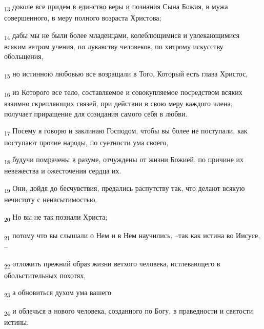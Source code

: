 \begin{tcolorbox}
\textsubscript{13} доколе все придем в единство веры и познания Сына Божия, в мужа совершенного, в меру полного возраста Христова;
\end{tcolorbox}
\begin{tcolorbox}
\textsubscript{14} дабы мы не были более младенцами, колеблющимися и увлекающимися всяким ветром учения, по лукавству человеков, по хитрому искусству обольщения,
\end{tcolorbox}
\begin{tcolorbox}
\textsubscript{15} но истинною любовью все возращали в Того, Который есть глава Христос,
\end{tcolorbox}
\begin{tcolorbox}
\textsubscript{16} из Которого все тело, составляемое и совокупляемое посредством всяких взаимно скрепляющих связей, при действии в свою меру каждого члена, получает приращение для созидания самого себя в любви.
\end{tcolorbox}
\begin{tcolorbox}
\textsubscript{17} Посему я говорю и заклинаю Господом, чтобы вы более не поступали, как поступают прочие народы, по суетности ума своего,
\end{tcolorbox}
\begin{tcolorbox}
\textsubscript{18} будучи помрачены в разуме, отчуждены от жизни Божией, по причине их невежества и ожесточения сердца их.
\end{tcolorbox}
\begin{tcolorbox}
\textsubscript{19} Они, дойдя до бесчувствия, предались распутству так, что делают всякую нечистоту с ненасытимостью.
\end{tcolorbox}
\begin{tcolorbox}
\textsubscript{20} Но вы не так познали Христа;
\end{tcolorbox}
\begin{tcolorbox}
\textsubscript{21} потому что вы слышали о Нем и в Нем научились, --так как истина во Иисусе, --
\end{tcolorbox}
\begin{tcolorbox}
\textsubscript{22} отложить прежний образ жизни ветхого человека, истлевающего в обольстительных похотях,
\end{tcolorbox}
\begin{tcolorbox}
\textsubscript{23} а обновиться духом ума вашего
\end{tcolorbox}
\begin{tcolorbox}
\textsubscript{24} и облечься в нового человека, созданного по Богу, в праведности и святости истины.
\end{tcolorbox}

